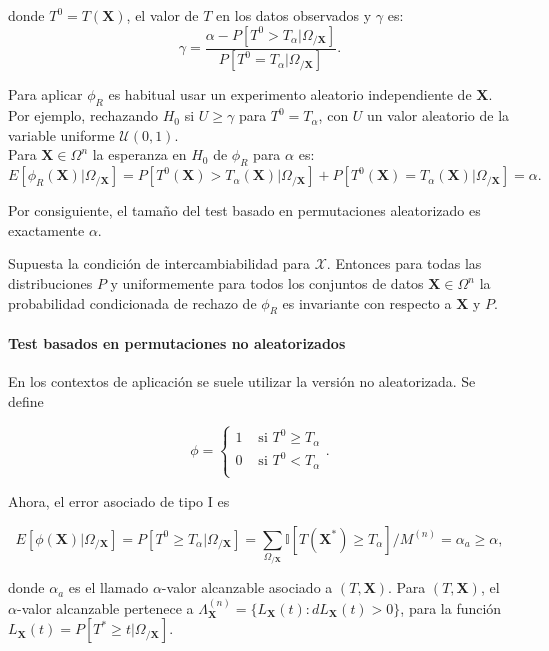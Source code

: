 	donde $T^0 = T(\mathbf{X})$, el valor de $T$ en los datos observados y $\gamma$ es:
	\[
		\gamma = \frac{\alpha - P[T^0 > T_\alpha | 
								\Omega_{/\mathbf{X}}]}
					  {P[T^0 = T_\alpha | 
								\Omega_{/\mathbf{X}}]} .
	\]
	
	Para aplicar $\phi_R$ es habitual usar un experimento aleatorio independiente de $\mathbf{X}$. Por ejemplo, rechazando $H_0$ si $U \geq \gamma$ para $T^0 = T_\alpha$, con $U$ un valor aleatorio de la variable uniforme $\mathcal{U}(0,1)$.\\
	Para $\mathbf{X} \in \Omega^n$ la esperanza en $H_0$ de $\phi_R$ para $\alpha$ es:
	\[ 
		E[ \phi_R(\mathbf{X}) | \Omega_{/\mathbf{X}}] =
			P[ T^0(\mathbf{X}) > T_\alpha(\mathbf{X}) | 
								\Omega_{/\mathbf{X}}] + 
			P[ T^0(\mathbf{X}) = T_\alpha(\mathbf{X}) | 
								\Omega_{/\mathbf{X}}] =
			\alpha .
	\]
	
	Por consiguiente, el tamaño del test basado en permutaciones aleatorizado es exactamente $\alpha$.
	
\begin{proposicion}
	Supuesta la condición de intercambiabilidad para $\mathcal{X}$. Entonces para todas las distribuciones $P$ y uniformemente para todos los conjuntos de datos $\mathbf{X} \in \Omega^n$ la probabilidad condicionada de rechazo de $\phi_R$ es invariante con respecto a $\mathbf{X}$ y $P$.
\end{proposicion}

\paragraph{Test basados en permutaciones no aleatorizados}

	En los contextos de aplicación se suele utilizar la versión no aleatorizada. Se define
	
	\[ 
		\phi = \left\lbrace \begin{array}{cc}
			1 		& \text{ si } T^0 \geq T_\alpha \\
			0		& \text{ si } T^0 < T_\alpha \\
		\end{array} \right. .
	\]
	
	Ahora, el error asociado de tipo I es 
	
	\[ 
		E[ \phi(\mathbf{X}) | \Omega_{/\mathbf{X}}] =
		P[ T^0 \geq T_\alpha | \Omega_{/\mathbf{X}}] =
		\sum\limits_{\Omega_{/\mathbf{X}}}
			\mathbb{I}[ T(\mathbf{X}^*) \geq T_\alpha ]/
				M^{(n)} =
		\alpha_a \geq
		\alpha,
	\] 
	
	donde $\alpha_a$ es el llamado $\alpha$-valor alcanzable asociado a $(T, \mathbf{X})$. Para $(T,\mathbf{X})$, el $\alpha$-valor alcanzable pertenece a $\Lambda_\mathbf{X}^{(n)} = \{ L_\mathbf{X}(t): dL_\mathbf{X}(t) > 0 \}$, para la función $ L_\mathbf{X}(t) = P[ T^* \geq t | \Omega_{/\mathbf{X}}] $. 
	
